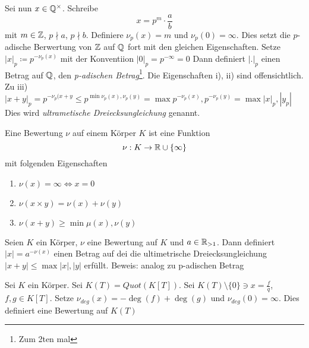 \documentclass[../main.tex]{subfiles}
\begin{document}
Sei nun $x\in \mathbb{Q}^\times$. Schreibe
$$x=p^m\cdot\frac{a}{b}$$ mit $m\in \mathbb{Z}$, $p\nmid a$, $p\nmid b$.
Definiere $\nu_p(x) = m$ und $\nu_p(0) = \infty$. Dies setzt die $p$-adische Berwertung von $\mathbb{Z}$ auf $\mathbb{Q}$ fort mit den gleichen Eigenschaften.
Setze $|x|_p \coloneqq p^{-\nu_p(x)}$ mit der Konventiion $|0|_p = p^{-\infty} = 0$
Dann definiert $|.|_p$ einen Betrag auf $\mathbb{Q}$, den \emph{p-adischen Betrag}\footnote{Zum 2ten mal}. Die Eigenschaften i), ii) sind offensichtlich.
Zu iii) $|x+y|_p = p^{-\nu_p(x+y}\leq p^{\min{\nu_p(x),\nu_p(y)}} = \max{p^{-\nu_p(x)}, p^{-\nu_p(y)}} = \max{|x|_p,|y_p|}$ %
Dies wird \emph{ultrametische Dreiecksungleichung} genannt.
\begin{definition}
    Eine Bewertung $\nu$ auf einem Körper $K$ ist eine Funktion $$\nu:K\rightarrow \mathbb{R}\cup \{\infty\}$$
    mit folgenden Eigenschaften
    \begin{enumerate}[label=\roman*)]
        \item $\nu(x) = \infty \Leftrightarrow x= 0$
        \item $\nu(x\times y) = \nu(x)+\nu(y)$
        \item $\nu(x+y) \geq \min{\mu(x), \nu(y)}$ 
    \end{enumerate}
\end{definition}
\begin{lemma}
    Seien $K$ ein Körper, $\nu$ eine Bewertung auf $K$ und $a\in \mathbb{R}_{>1}$. Dann definiert $|x| = a^{-\nu(x)}$ einen Betrag auf dei die ultimetrische Dreiecksungleichung $|x+y| \leq \max{|x|,|y|}$ erfüllt.
    Beweis: analog zu p-adischen Betrag
\end{lemma}
\begin{example}
    Sei $K$ ein Körper. Sei $K(T) = Quot(K[T])$.
    Sei $K(T)\setminus\{0\}\ni x = \frac{f}{q}$, $f,g\in K[T]$.
    Setze $\nu_{deg}(x) = -\deg(f)+\deg(g)$ und $\nu_{deg}(0) = \infty$.
    Dies definiert eine Bewertung auf $K(T)$
\end{example}
\end{document}
